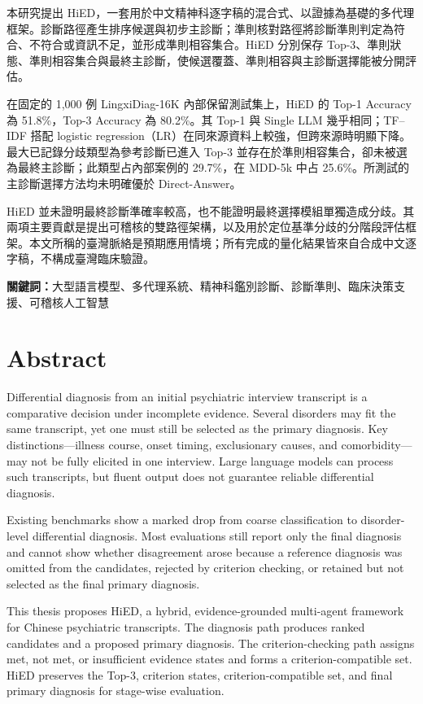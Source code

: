 \documentclass[12pt,a4paper,oneside]{report}
\begin{document}
本研究提出 HiED，一套用於中文精神科逐字稿的混合式、以證據為基礎的多代理框架。診斷路徑產生排序候選與初步主診斷；準則核對路徑將診斷準則判定為符合、不符合或資訊不足，並形成準則相容集合。HiED 分別保存 Top-3、準則狀態、準則相容集合與最終主診斷，使候選覆蓋、準則相容與主診斷選擇能被分開評估。

在固定的 1,000 例 LingxiDiag-16K 內部保留測試集上，HiED 的 Top-1 Accuracy 為 51.8\%，Top-3 Accuracy 為 80.2\%。其 Top-1 與 Single LLM 幾乎相同；TF--IDF 搭配 logistic regression（LR）在同來源資料上較強，但跨來源時明顯下降。最大已記錄分歧類型為參考診斷已進入 Top-3 並存在於準則相容集合，卻未被選為最終主診斷；此類型占內部案例的 29.7\%，在 MDD-5k 中占 25.6\%。所測試的主診斷選擇方法均未明確優於 Direct-Answer。

HiED 並未證明最終診斷準確率較高，也不能證明最終選擇模組單獨造成分歧。其兩項主要貢獻是提出可稽核的雙路徑架構，以及用於定位基準分歧的分階段評估框架。本文所稱的臺灣脈絡是預期應用情境；所有完成的量化結果皆來自合成中文逐字稿，不構成臺灣臨床驗證。

\noindent\textbf{關鍵詞：}大型語言模型、多代理系統、精神科鑑別診斷、診斷準則、臨床決策支援、可稽核人工智慧
\chapter*{Abstract}
Differential diagnosis from an initial psychiatric interview transcript is a comparative decision under incomplete evidence. Several disorders may fit the same transcript, yet one must still be selected as the primary diagnosis. Key distinctions---illness course, onset timing, exclusionary causes, and comorbidity---may not be fully elicited in one interview. Large language models can process such transcripts, but fluent output does not guarantee reliable differential diagnosis.

Existing benchmarks show a marked drop from coarse classification to disorder-level differential diagnosis. Most evaluations still report only the final diagnosis and cannot show whether disagreement arose because a reference diagnosis was omitted from the candidates, rejected by criterion checking, or retained but not selected as the final primary diagnosis.

This thesis proposes HiED, a hybrid, evidence-grounded multi-agent framework for Chinese psychiatric transcripts. The diagnosis path produces ranked candidates and a proposed primary diagnosis. The criterion-checking path assigns met, not met, or insufficient evidence states and forms a criterion-compatible set. HiED preserves the Top-3, criterion states, criterion-compatible set, and final primary diagnosis for stage-wise evaluation.
\end{document}
